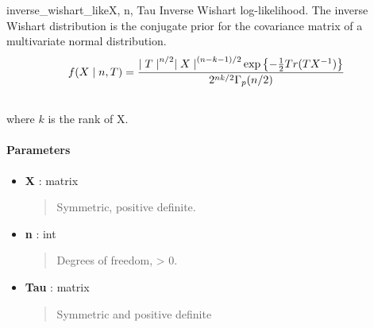 \hypertarget{pymc.distributions.inverse_wishart_like}{}\begin{funcdesc}{inverse\_wishart\_like}{X, n, Tau}
Inverse Wishart log-likelihood. The inverse Wishart distribution is the conjugate 
prior for the covariance matrix of a multivariate normal distribution.
\begin{gather}
\begin{split}f(X \mid n, T) = \frac{{\mid T \mid}^{n/2}{\mid X \mid}^{(n-k-1)/2} \exp\left\{ -\frac{1}{2} Tr(TX^{-1}) \right\}}{2^{nk/2} \Gamma_p(n/2)}\end{split}\notag\\\begin{split}\end{split}\notag
\end{gather}
where $k$ is the rank of X.
\paragraph{Parameters}\begin{itemize}

\item[] \textbf{X} : matrix
\begin{quote}

Symmetric, positive definite.
\end{quote}

\item[] \textbf{n} : int
\begin{quote}

Degrees of freedom, \textgreater{} 0.
\end{quote}

\item[] \textbf{Tau} : matrix
\begin{quote}

Symmetric and positive definite
\end{quote}
\end{itemize}
\end{funcdesc}

